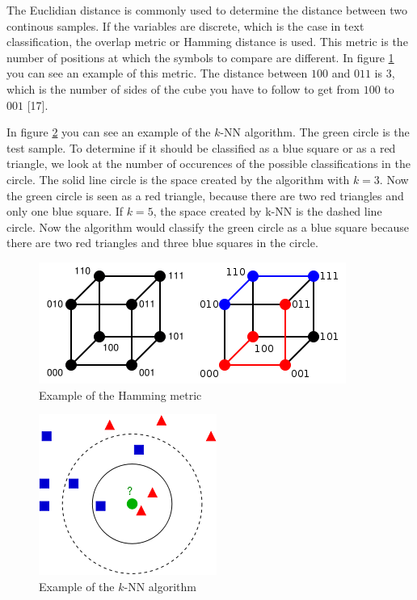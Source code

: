 \documentclass[12pt]{article}
\begin{document}
The Euclidian distance is commonly used to determine the distance between two continous samples. If the variables are discrete, which is the case in text classification, the overlap metric or Hamming distance is used. This metric is the number of positions at which the symbols to compare are different. In figure \ref{hamming} you can see an example of this metric. The distance between $100$ and $011$ is $3$, which is the number of sides of the cube you have to follow to get from $100$ to $001$ [17].
\newline

In figure \ref{kNN} you can see an example of the $k$-NN algorithm. The green circle is the test sample. To determine if it should be classified as a blue square or as a red triangle, we look at the number of occurences of the possible classifications in the circle. The solid line circle is the space created by the algorithm with $k = 3$. Now the green circle is seen as a red triangle, because there are two red triangles and only one blue square. If $k = 5$, the space created by k-NN is the dashed line circle. Now the algorithm would classify the green circle as a blue square because there are two red triangles and three blue squares in the circle. 

\begin{figure}[H]
\centering
\includegraphics[scale = 0.7]{img/hamming}
\caption{Example of the Hamming metric}
\label{hamming}
\end{figure} 

\begin{figure}[H]
\centering
\includegraphics[scale = 0.6]{img/kNN}
\caption{Example of the $k$-NN algorithm}
\label{kNN}
\end{figure} 
	
\end{document}
